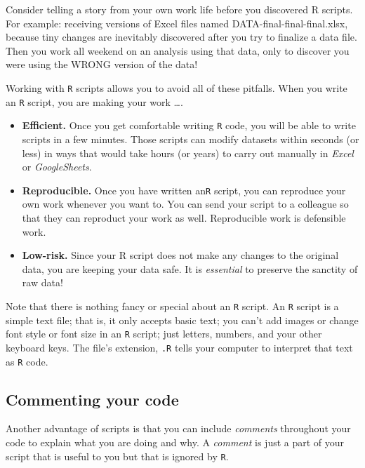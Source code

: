 \documentclass[
]{book}
\begin{document}
Consider telling a story from your own work life before you discovered R scripts. For example: receiving versions of Excel files named DATA-final-final-final.xlsx, because tiny changes are inevitably discovered after you try to finalize a data file. Then you work all weekend on an analysis using that data, only to discover you were using the WRONG version of the data!

Working with \texttt{R} scripts allows you to avoid all of these pitfalls. When you write an \texttt{R} script, you are making your work \ldots.

\begin{itemize}
\item
  \textbf{Efficient.} Once you get comfortable writing \texttt{R} code, you will be able to write scripts in a few minutes. Those scripts can modify datasets within seconds (or less) in ways that would take hours (or years) to carry out manually in \emph{Excel} or \emph{GoogleSheets}.
\item
  \textbf{Reproducible.} Once you have written an\texttt{R} script, you can reproduce your own work whenever you want to. You can send your script to a colleague so that they can reproduct your work as well. Reproducible work is defensible work.
\item
  \textbf{Low-risk.} Since your R script does not make any changes to the original data, you are keeping your data safe. It is \emph{essential} to preserve the sanctity of raw data!
\end{itemize}

Note that there is nothing fancy or special about an \texttt{R} script. An \texttt{R} script is a simple text file; that is, it only accepts basic text; you can't add images or change font style or font size in an \texttt{R} script; just letters, numbers, and your other keyboard keys. The file's extension, \texttt{.R} tells your computer to interpret that text as \texttt{R} code.

\hypertarget{commenting-your-code}{%
\subsection*{Commenting your code}\label{commenting-your-code}}

Another advantage of scripts is that you can include \emph{comments} throughout your code to explain what you are doing and why. A \emph{comment} is just a part of your script that is useful to you but that is ignored by \texttt{R}.
\end{document}
